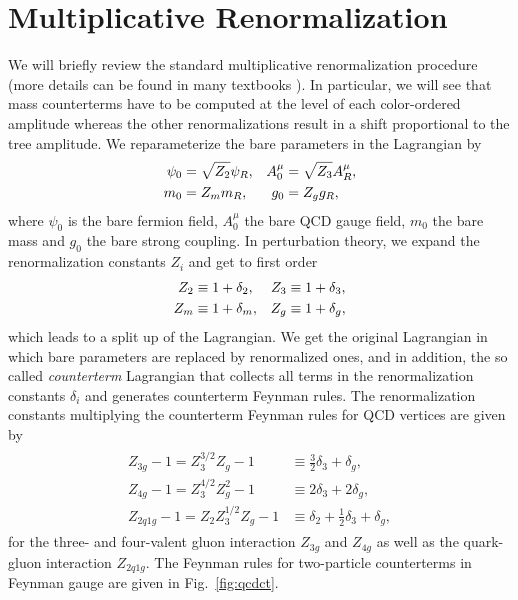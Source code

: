 \section{Multiplicative Renormalization}
\label{sec:stdrenorm}
We will briefly review the standard multiplicative renormalization
procedure (more details can be found in many textbooks \cite{PeskinS,Schwartz:2013pla,Bohm:2001yx}). In particular, we will see that mass counterterms have to
be computed at the level of each color-ordered amplitude whereas the
other renormalizations result in a shift proportional to the tree amplitude. We
reparameterize the bare parameters in the Lagrangian by 
\begin{align}
  \psi_0 & = \sqrt{Z_2}\psi_R, & A_0^\mu & =  \sqrt{Z_3} A_R^\mu, \\
m_0 & = Z_m m_R, & g_0 & = Z_g g_R, \notag
\end{align}
where $\psi_0$ is the bare fermion field, $A^\mu_0$ the bare QCD gauge field, $m_0$
the bare mass and $g_0$ the bare strong coupling. In perturbation
theory, we expand the renormalization constants $Z_i$ and get to first order
\begin{align}\label{eq:renconst}
  Z_2 & \equiv 1 + \delta_2, &  Z_3 &\equiv 1 + \delta_3,  \\
  Z_m & \equiv 1 + \delta_m, &  Z_g &\equiv 1 + \delta_g, \notag 
\end{align}
which leads to a split up of the Lagrangian. We get the
original Lagrangian in which bare parameters are replaced by
renormalized ones, and in addition, the so called \textit{counterterm}
Lagrangian that collects all terms in the renormalization constants $\delta_i$
and generates counterterm Feynman rules. The renormalization constants
multiplying the counterterm Feynman rules for QCD vertices are given by
\begin{align}\label{eq:vertqcdct}
\begin{split}
  Z_{3g}-1 = Z_3^{3/2}Z_g-1 &\equiv \frac{3}{2} \delta_3 +
  \delta_g, \\
  Z_{4g}-1 = Z_3^{4/2}Z_g^2 -1&\equiv  2\delta_3 + 2 \delta_g, \\
Z_{2q1g} -1= Z_2 Z_3^{1/2}Z_g -1 &\equiv  \delta_2 +
  \frac{1}{2}\delta_3 + \delta_g,
\end{split}
\end{align}
for the three- and four-valent gluon interaction $Z_{3g}$ and $Z_{4g}$
as well as the quark-gluon interaction $Z_{2q1g}$. The Feynman
rules for two-particle counterterms in Feynman gauge are given in Fig.~\ref{fig:qcdct}.
